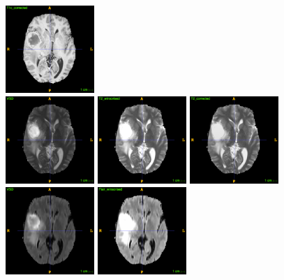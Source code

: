 \documentclass[12pt,a4paper,twoside,openright]{report}
\begin{document}
\begin{figure}
	\includegraphics[width=0.3\textwidth]{t1c_n4itk_example} \\
	\vspace{0.5cm}
	\includegraphics[width=0.3\textwidth]{t2_no_norm_example}
	\includegraphics[width=0.3\textwidth]{t2_winsorized_example}
	\includegraphics[width=0.3\textwidth]{t2_n4itk_example} \\
	\vspace{0.5cm}
	\includegraphics[width=0.3\textwidth]{flair_no_norm_example}
	\includegraphics[width=0.3\textwidth]{flair_winsorized_example}

\end{figure}
\end{document}

